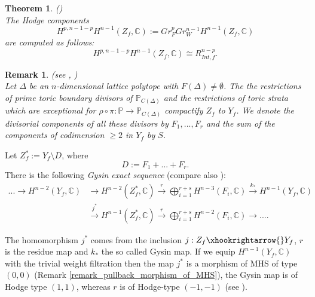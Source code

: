 \documentclass[12pt, english]{article}
\newtheorem{remark}[definition]{Remark}
\newtheorem{theorem}[definition]{Theorem}
\begin{document}
\begin{theorem} \label{theorem_batyrev_hodge_components} (\cite[Prop.9.2]{Bat93}) \\
	The Hodge components 
	\[ H^{p,n-1-p}H^{n-1}(Z_f,\mathbb{C}) := Gr_F^p Gr_W^{n-1}H^{n-1}(Z_f,\mathbb{C}) \] 
	are computed as follows:
	\[ H^{p,n-1-p} H^{n-1}(Z_f, \mathbb{C}) \cong R_{Int,f}^{n-p}.  \]
\end{theorem}








\begin{remark}
	\normalfont
	(see \cite{Bat22}, \cite[section 2]{Gie22})\\
	Let $\Delta$ be an $n$-dimensional lattice polytope with $F(\Delta) \neq \emptyset$. The the restrictions of prime toric boundary divisors of $\mathbb{P}_{C(\Delta)}$ and the restrictions of toric strata which are exceptional for $\rho \circ \pi: \mathbb{P} \rightarrow \mathbb{P}_{C(\Delta)}$ compactify $Z_f$ to $Y_f$. We denote the divisorial components of all these divisors by $F_1,...,F_r$ and the sum of the components of codimension $\geq 2$ in $Y_f$ by $S$.
	
\end{remark}	

Let $Z_f^*:= Y_f \setminus D$, where
\[ D:= F_1 + ... + F_r.  \]
There is the following \textit{Gysin exact sequence} (compare also \cite[Proof of Thm.3.7]{DK86}):
\begin{align*}
	... \rightarrow H^{n-2}(Y_f,\mathbb{C}) &\rightarrow H^{n-2}(Z_f^*,\mathbb{C}) \overset{r}{\rightarrow} \bigoplus\limits_{i = 1}^{r+s}  H^{n-3}(F_i, \mathbb{C}) \overset{k_{*}}{\rightarrow} H^{n-1}(Y_f, \mathbb{C}) \\
	&  \overset{j^{*}}{\rightarrow} H^{n-1}(Z_f^*, \mathbb{C}) \overset{r}{\rightarrow} \bigoplus\limits_{i = 1}^{r+s}  H^{n-2}(F_i, \mathbb{C}) \rightarrow ....
\end{align*}

The homomorphism $j^*$ comes from the inclusion $j: Z_{f} \xhookrightarrow{} Y_f$, $r$ is the residue map and $k_{*}$ the so called Gysin map. If we equip $H^{n-1}(Y_f, \mathbb{C})$ with the trivial weight filtration then the map $j^{*}$ is a morphism of MHS of type $(0,0)$ (Remark \ref{remark_pullback_morphism_of_MHS}), the Gysin map is of Hodge type $(1,1)$, whereas $r$ is of Hodge-type $(-1,-1)$ (see \cite[Ch.7]{Voi02}). 
\end{document}
